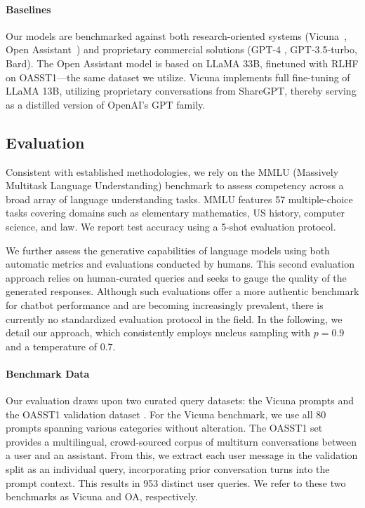 \paragraph{Baselines} Our models are benchmarked against both research-oriented systems (Vicuna~\citep{vicuna2023}, Open Assistant~\citep{kopf2023openassistant}) and proprietary commercial solutions (GPT-4 \citep{openai2023gpt}, GPT-3.5-turbo, Bard). The Open Assistant model is based on LLaMA 33B, finetuned with RLHF on OASST1—the same dataset we utilize. Vicuna implements full fine-tuning of LLaMA 13B, utilizing proprietary conversations from ShareGPT, thereby serving as a distilled version of OpenAI’s GPT family.

\subsection{Evaluation}

Consistent with established methodologies, we rely on the MMLU (Massively Multitask Language Understanding) benchmark \citep{hendrycksmeasuring} to assess competency across a broad array of language understanding tasks. MMLU features 57 multiple-choice tasks covering domains such as elementary mathematics, US history, computer science, and law. We report test accuracy using a 5-shot evaluation protocol.

We further assess the generative capabilities of language models using both automatic metrics and evaluations conducted by humans. This second evaluation approach relies on human-curated queries and seeks to gauge the quality of the generated responses. Although such evaluations offer a more authentic benchmark for chatbot performance and are becoming increasingly prevalent, there is currently no standardized evaluation protocol in the field. In the following, we detail our approach, which consistently employs nucleus sampling with $p=0.9$ and a temperature of $0.7$.

\paragraph{Benchmark Data} Our evaluation draws upon two curated query datasets: the Vicuna prompts \citep{vicuna2023} and the OASST1 validation dataset \citep{kopf2023openassistant}. For the Vicuna benchmark, we use all 80 prompts spanning various categories without alteration. The OASST1 set provides a multilingual, crowd-sourced corpus of multiturn conversations between a user and an assistant. From this, we extract each user message in the validation split as an individual query, incorporating prior conversation turns into the prompt context. This results in 953 distinct user queries. We refer to these two benchmarks as Vicuna and OA, respectively.

